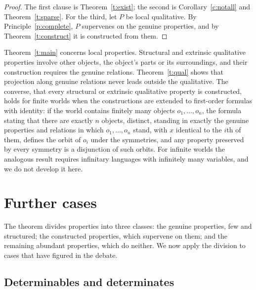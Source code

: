 \documentclass{situationist-preprint}
\begin{document}
\begin{proof}
The first clause is Theorem~\ref{t:exist}; the second is Corollary~\ref{c:notall} and Theorem~\ref{t:sparse}. For the third, let $P$ be local qualitative. By Principle~\ref{p:complete}, $P$ supervenes on the genuine properties, and by Theorem~\ref{t:construct} it is constructed from them.
\end{proof}

\begin{remark}\label{r:relational}
Theorem~\ref{t:main} concerns local properties. Structural and extrinsic qualitative properties involve other objects, the object's parts or its surroundings, and their construction requires the genuine relations. Theorem~\ref{t:qual} shows that projection along genuine relations never leads outside the qualitative. The converse, that every structural or extrinsic qualitative property is constructed, holds for finite worlds when the constructions are extended to first-order formulas with identity: if the world contains finitely many objects $o_1,\dots,o_n$, the formula stating that there are exactly $n$ objects, distinct, standing in exactly the genuine properties and relations in which $o_1,\dots,o_n$ stand, with $x$ identical to the $i$th of them, defines the orbit of $o_i$ under the symmetries, and any property preserved by every symmetry is a disjunction of such orbits. For infinite worlds the analogous result requires infinitary languages with infinitely many variables, and we do not develop it here.
\end{remark}

\section{Further cases}\label{s:cases}

The theorem divides properties into three classes: the genuine properties, few and structured; the constructed properties, which supervene on them; and the remaining abundant properties, which do neither. We now apply the division to cases that have figured in the debate.

\subsection{Determinables and determinates}
\end{document}
